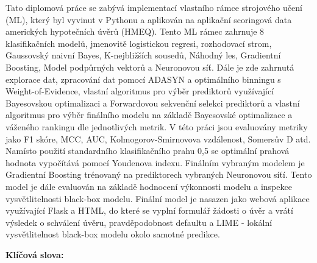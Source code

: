 Tato diplomov\'{a} pr\'{a}ce se zab\'{y}v\'{a} implementac\'{i} vlastn\'{i}ho r\'{a}mce strojov\'{e}ho u\v{c}en\'{i} (ML), kter\'{y} byl vyvinut v Pythonu a aplikov\'{a}n na aplika\v{c}n\'{i} scoringov\'{a} data americk\'{y}ch hypote\v{c}n\'{i}ch \'{u}v\v{e}r\r{u} (HMEQ).
Tento ML r\'{a}mec zahrnuje 8 klasifika\v{c}n\'{i}ch model\r{u}, jmenovit\v{e} logistickou regresi, rozhodovac\'{i} strom, Gaussovsk\'{y} naivn\'{i} Bayes, K-nejbli\v{z}\v{s}\'{i}ch soused\r{u}, N\'{a}hodn\'{y} les, Gradientn\'{i} Boosting, Model podp\r{u}rn\'{y}ch vektor\r{u} a Neuronovou s\'{i}\v{t}.
D\'{a}le je zde zahrnut\'{a} explorace dat, zpracov\'{a}n\'{i} dat pomoc\'{i} ADASYN a optim\'{a}ln\'{i}ho binningu s Weight-of-Evidence, vlastn\'{i} algoritmus pro v\'{y}b\v{e}r prediktor\r{u} vyu\v{z}\'{i}vaj\'{i}c\'{i} Bayesovskou optimalizaci a Forwardovou sekven\v{c}n\'{i} selekci prediktor\r{u} a
vlastn\'{i} algoritmus pro v\'{y}b\v{e}r fin\'{a}ln\'{i}ho modelu na z\'{a}klad\v{e} Bayesovsk\'{e} optimalizace a v\'{a}\v{z}en\'{e}ho rankingu dle jednotliv\'{y}ch metrik. V t\'{e}to pr\'{a}ci jsou evaluov\'{a}ny metriky jako F1 sk\'{o}re, MCC, AUC, Kolmogorov-Smirnovova vzd\'{a}lenost, Somers\r{u}v D atd.
Nam\'{i}sto pou\v{z}it\'{i} standardn\'{i}ho klasifika\v{c}n\'{i}ho prahu 0,5 se optim\'{a}ln\'{i} prahov\'{a} hodnota vypo\v{c}\'{i}t\'{a}v\'{a} pomoc\'{i} Youdenova indexu.
Fin\'{a}ln\'{i}m vybran\'{y}m modelem je Gradientn\'{i} Boosting tr\'{e}novan\'{y} na prediktorech vybran\'{y}ch Neuronovou s\'{i}\v{t}\'{i}.
Tento model je d\'{a}le evaluov\'{a}n na z\'{a}klad\v{e} hodnocen\'{i} v\'{y}konnosti modelu a inspekce vysv\v{e}tlitelnosti black-box modelu.
Fin\'{a}ln\'{i} model je nasazen jako webov\'{a} aplikace vyu\v{z}\'{i}vaj\'{i}c\'{i} Flask a HTML, do kter\'{e} se vypln\'{i} formul\'{a}\v{r} \v{z}\'{a}dosti o \'{u}v\v{e}r a vr\'{a}t\'{i} v\'{y}sledek o schv\'{a}len\'{i} \'{u}v\v{e}ru, pravd\v{e}podobnost defaultu a LIME - lok\'{a}ln\'{i} vysv\v{e}tlitelnost black-box modelu okolo samotn\'{e} predikce.

\bigskip

\textbf{Kl\'{i}\v{c}ov\'{a} slova:} \Klic

